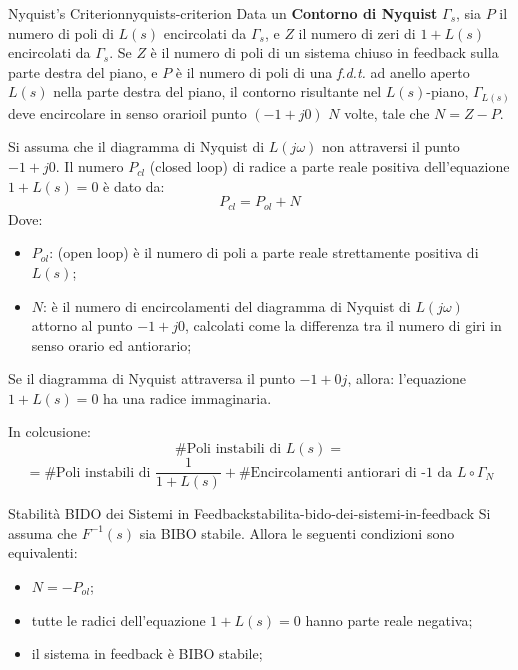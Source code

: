 \documentclass[12pt]{article}
\begin{document}
\begin{theorem}{Nyquist's Criterion}{nyquists-criterion}
    Data un \textbf{Contorno di Nyquist} $\Gamma_s$, sia $P$ il numero di poli di $L(s)$ encircolati da $\Gamma_s$, e $Z$ il numero di zeri di $1 + L(s)$ encircolati da $\Gamma_s$. Se $Z$ \`e il numero di poli di un sistema chiuso in feedback sulla parte destra del piano, e $P$ \`e il numero di poli di una \emph{f.d.t.} ad anello aperto $L(s)$ nella parte destra del piano, il contorno risultante nel $L(s)$-piano, $\Gamma _{L(s)}$ deve encircolare in senso orarioil punto $(-1 + j0)$ $N$ volte, tale che $N = Z - P$.

    Si assuma che il diagramma di Nyquist di $L(j\omega)$ non attraversi il punto $-1+j0$. Il numero $P _{cl}$ (closed loop) di radice a parte reale positiva dell'equazione $1 + L(s) = 0$ \`e dato da:
    \[ P _{cl} = P _{ol} +  N \]
    Dove:
    \begin{itemize}
        \item $P _{ol}$: (open loop) \`e il numero di poli a parte reale strettamente positiva di $L(s)$;
        \item $N$: \`e il numero di encircolamenti del diagramma di Nyquist di $L(j\omega)$ attorno al punto $-1 +j0$, calcolati come la differenza tra il numero di giri in senso orario ed antiorario;
    \end{itemize}

    Se il diagramma di Nyquist attraversa il punto $-1 +0j$, allora: l'equazione $1 + L(s) = 0$ ha una radice immaginaria.

    In colcusione:
    \[ \#\text{Poli instabili di }L(s) = \]
\[ = \#\text{Poli instabili di }\frac{1}{1 + L(s)} + \#\text{Encircolamenti antiorari di -1 da } L\circ\Gamma_N \]
\end{theorem}

\begin{theorem}{Stabilit\`a BIDO dei Sistemi in Feedback}{stabilita-bido-dei-sistemi-in-feedback}
    Si assuma che $F^{-1}(s)$ sia BIBO stabile. Allora le seguenti condizioni sono equivalenti:
    \begin{itemize}
        \item $N = -P _{ol}$;
        \item tutte le radici dell'equazione $1 + L(s) = 0$ hanno parte reale negativa;\
        \item il sistema in feedback \`e BIBO stabile;
    \end{itemize}
\end{theorem}
\end{document}
